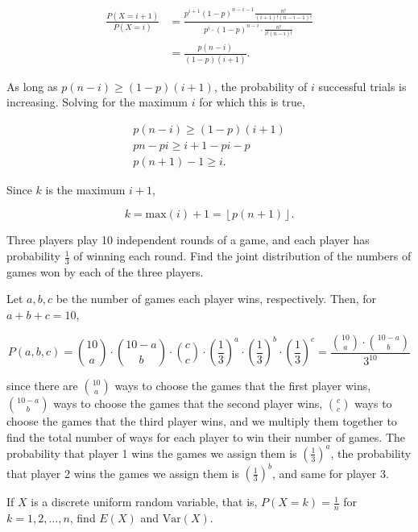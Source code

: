 \documentclass[answers]{exam}
\begin{document}
\begin{questions}
\begin{solution}
\begin{align*}
    \frac{P(X=i+1)}{P(X=i)} &= \frac{p^{i+1}(1-p)^{n-i-1}\frac{n!}{(i+1)!(n-i-1)!}}{p^{i} \cdot (1-p)^{n-i} \cdot \frac{n!}{i!(n-i)!}} \\ 
    &= \frac{p(n-i)}{(1-p)(i+1)}
.\end{align*}

As long as $p(n-i) \ge (1-p)(i+1)$, the probability of $i$ successful
trials is increasing. Solving for the maximum $i$ for which this is true,

\begin{gather*}
p(n-i) \ge (1-p)(i+1) \\ 
pn - pi \ge  i + 1 - pi - p \\ 
p(n+1) - 1 \ge i.
\end{gather*}

Since $k$ is the maximum $i + 1$,

\[
    k = \text{max}(i) + 1 = \left\lfloor p(n+1) \right\rfloor
.\] 
\end{solution}

\question[10]
Three players play 10 independent rounds of a game, and each player has
probability \(\frac{1}{3}\) of winning each round. Find the joint distribution
of the numbers of games won by each of the three players.

\begin{solution}
Let $a,b,c$ be the number of games each player wins, respectively. Then, for $a
+ b + c = 10$, 

\[
P(a,b,c) = \binom{10}{a} \cdot \binom{10 - a}{b} \cdot \binom{c}{c} \cdot 
\left( \frac{1}{3} \right)^{a} \cdot \left( \frac{1}{3} \right) ^{b} \cdot \left( \frac{1}{3} \right) ^{c} 
= \frac{\binom{10}{a} \cdot \binom{10 - a}{b}}{3^{10}}
\] 

since there are $\binom{10}{a}$ ways to choose the games that the first player
wins, $\binom{10-a}{b}$ ways to choose the games that the second player wins, 
$\binom{c}{c}$ ways to choose the games that the third player wins, and we
multiply them together to find the total number of ways for each player to win
their number of games. The probability that player 1 wins the games we assign
them is $(\frac{1}{3})^{a}$, the probability that player 2 wins the games we
assign them is $(\frac{1}{3})^{b}$, and same for player 3.
\end{solution}

\question[10]
If \(X\) is a discrete uniform random variable, that is, \(P(X=k)=\frac{1}{n}\)
for \(k=1,2,...,n\), find \(E(X)\) and \(\text{Var}(X)\).


\end{questions}
\end{document}
